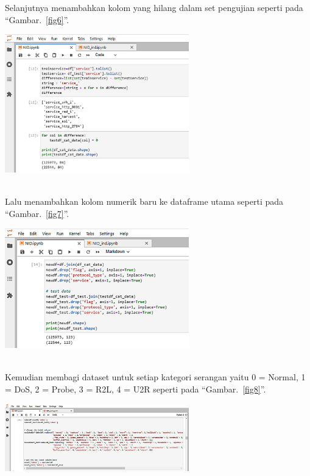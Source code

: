 \documentclass[conference]{IEEEtran}
\begin{document}
Selanjutnya menambahkan kolom yang hilang dalam set pengujian seperti pada ``Gambar.~\ref{fig6}''.\\

\begin{minipage}{\linewidth}
\centerline{\includegraphics[width=80mm]{Gambar/Gbr05.jpg}}
\label{fig6}
\end{minipage}\\

Lalu menambahkan kolom numerik baru ke dataframe utama seperti pada ``Gambar.~\ref{fig7}''.\\

\begin{minipage}{\linewidth}
\centerline{\includegraphics[width=80mm]{Gambar/Gbr06.jpg}}
\label{fig7}
\end{minipage}\\

Kemudian membagi dataset untuk setiap kategori serangan yaitu 0 = Normal, 1 = DoS, 2 = Probe, 3 = R2L, 4 = U2R seperti pada ``Gambar.~\ref{fig8}''.\\

\begin{minipage}{\linewidth}
\centerline{\includegraphics[width=80mm]{Gambar/Gbr07.jpg}}
\label{fig8}
\end{minipage}\\
\end{document}
